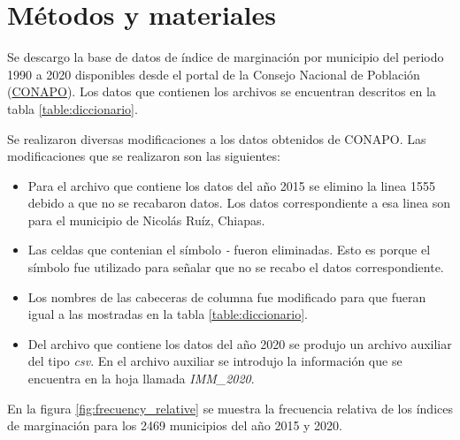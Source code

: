\section{Métodos y materiales}

Se descargo la base de datos de índice de marginación por municipio del periodo 1990 a 2020 disponibles desde el portal de la Consejo Nacional de Población (\href{https://datos.gob.mx/busca/dataset/indice-de-marginacion-carencias-poblacionales-por-localidad-municipio-y-entidad}{CONAPO})\cite{data_2015,data_2020}. Los datos que contienen los archivos se encuentran descritos en la tabla \ref{table:diccionario}.



Se realizaron diversas modificaciones a los datos obtenidos de CONAPO. Las modificaciones que se realizaron son las siguientes:

\begin{itemize}
    \item  Para el archivo que contiene los datos del año 2015 se elimino la linea 1555 debido a que no se recabaron datos. Los datos correspondiente a esa linea son para el municipio de Nicolás Ruíz, Chiapas.
    \item Las celdas que contenian el símbolo \textit{-} fueron eliminadas. Esto es porque el símbolo fue utilizado para señalar que no se recabo el datos correspondiente.
    \item Los nombres de las cabeceras de columna fue modificado para que fueran igual a las mostradas en la tabla \ref*{table:diccionario}.
    \item Del archivo que contiene los datos del año 2020 se produjo un archivo auxiliar del tipo \textit{csv}. En el archivo auxiliar se introdujo la información que se encuentra en la hoja llamada \textit{IMM\_2020}.
\end{itemize}

En la figura \ref{fig:frecuency_relative} se muestra la frecuencia relativa de los índices de marginación para los 2469 municipios del año 2015 y 2020.

